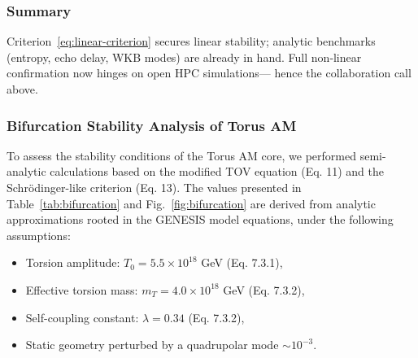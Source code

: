 \documentclass{article}
\begin{document}
\subsubsection{Summary}
Criterion~\eqref{eq:linear-criterion} secures linear stability; analytic
benchmarks (entropy, echo delay, WKB modes) are already in hand.
Full non‑linear confirmation now hinges on open HPC simulations—
hence the collaboration call above.
\medskip
\begin{center}
\end{center}
\medskip



\subsubsection{ Bifurcation Stability Analysis of Torus AM}

To assess the stability conditions of the Torus AM core, we performed semi-analytic calculations based on the modified TOV equation (Eq. 11) and the Schrödinger-like criterion (Eq. 13). The values presented in Table~\ref{tab:bifurcation} and Fig.~\ref{fig:bifurcation} are derived from analytic approximations rooted in the GENESIS model equations, under the following assumptions:

\begin{itemize}
  \item Torsion amplitude: $T_0 = 5.5 \times 10^{18}$ GeV (Eq. 7.3.1),
  \item Effective torsion mass: $m_T = 4.0 \times 10^{18}$ GeV (Eq. 7.3.2),
  \item Self-coupling constant: $\lambda = 0.34$ (Eq. 7.3.2),
  \item Static geometry perturbed by a quadrupolar mode $\sim 10^{-3}$.
\end{itemize}
\end{document}
